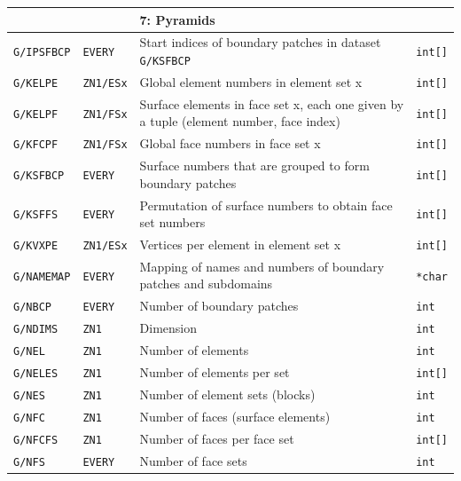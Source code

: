 \documentclass[a4paper,10pt]{article}
\begin{document}
\begin{table}
\begin{tabular}{llp{9cm}l}
                         &                   & 7: Pyramids   & \\ \hline
    \texttt{G/IPSFBCP}  & \texttt{EVERY}   & Start indices of boundary patches in dataset \texttt{G/KSFBCP} & \texttt{int[]} \\ \hline
    \texttt{G/KELPE}    & \texttt{ZN1/ESx} & Global element numbers in element set x       & \texttt{int[]} \\ \hline
    \texttt{G/KELPF}    & \texttt{ZN1/FSx} & Surface elements in face set x, each one given by a tuple (element number, face index) & \texttt{int[]} \\ \hline          
    \texttt{G/KFCPF}    & \texttt{ZN1/FSx} & Global face numbers in face set x             & \texttt{int[]} \\ \hline
    \texttt{G/KSFBCP}   & \texttt{EVERY}   & Surface numbers that are grouped to form boundary patches & \texttt{int[]} \\ \hline
    \texttt{G/KSFFS}    & \texttt{EVERY}   & Permutation of surface numbers to obtain face set numbers & \texttt{int[]} \\ \hline
    \texttt{G/KVXPE}    & \texttt{ZN1/ESx} & Vertices per element in element set x         & \texttt{int[]} \\ \hline
    \texttt{G/NAMEMAP}  & \texttt{EVERY}   & Mapping of names and numbers of boundary patches and subdomains & \texttt{*char} \\ \hline
    \texttt{G/NBCP}     & \texttt{EVERY}   & Number of boundary patches                    & \texttt{int} \\ \hline
    \texttt{G/NDIMS}    & \texttt{ZN1}     & Dimension                                     & \texttt{int} \\ \hline
    \texttt{G/NEL}      & \texttt{ZN1}     & Number of elements                            & \texttt{int} \\ \hline
    \texttt{G/NELES}    & \texttt{ZN1}     & Number of elements per set                    & \texttt{int[]} \\ \hline
    \texttt{G/NES}      & \texttt{ZN1}     & Number of element sets (blocks)               & \texttt{int} \\ \hline
    \texttt{G/NFC}      & \texttt{ZN1}     & Number of faces (surface elements)            & \texttt{int} \\ \hline
    \texttt{G/NFCFS}    & \texttt{ZN1}     & Number of faces per face set                  & \texttt{int[]} \\ \hline
    \texttt{G/NFS}      & \texttt{EVERY}   & Number of face sets                           & \texttt{int} \\

\end{tabular}
\end{table}
\end{document}
